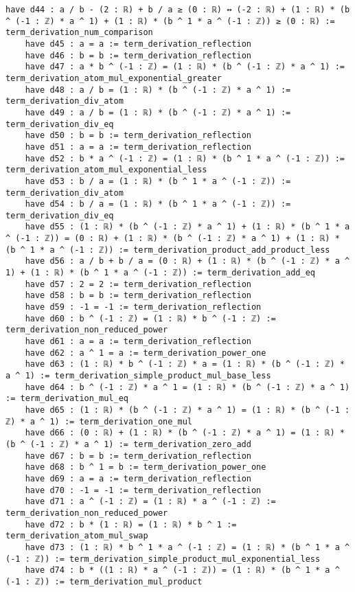 \documentclass{article}
\begin{document}
\begin{tcolorbox}[colback=white!10, width=\linewidth]
\begin{lstlisting}[language=Lean4]
    have d44 : a / b - (2 : ℝ) + b / a ≥ (0 : ℝ) ↔ (-2 : ℝ) + (1 : ℝ) * (b ^ (-1 : ℤ) * a ^ 1) + (1 : ℝ) * (b ^ 1 * a ^ (-1 : ℤ)) ≥ (0 : ℝ) := term_derivation_num_comparison
    have d45 : a = a := term_derivation_reflection
    have d46 : b = b := term_derivation_reflection
    have d47 : a * b ^ (-1 : ℤ) = (1 : ℝ) * (b ^ (-1 : ℤ) * a ^ 1) := term_derivation_atom_mul_exponential_greater
    have d48 : a / b = (1 : ℝ) * (b ^ (-1 : ℤ) * a ^ 1) := term_derivation_div_atom
    have d49 : a / b = (1 : ℝ) * (b ^ (-1 : ℤ) * a ^ 1) := term_derivation_div_eq
    have d50 : b = b := term_derivation_reflection
    have d51 : a = a := term_derivation_reflection
    have d52 : b * a ^ (-1 : ℤ) = (1 : ℝ) * (b ^ 1 * a ^ (-1 : ℤ)) := term_derivation_atom_mul_exponential_less
    have d53 : b / a = (1 : ℝ) * (b ^ 1 * a ^ (-1 : ℤ)) := term_derivation_div_atom
    have d54 : b / a = (1 : ℝ) * (b ^ 1 * a ^ (-1 : ℤ)) := term_derivation_div_eq
    have d55 : (1 : ℝ) * (b ^ (-1 : ℤ) * a ^ 1) + (1 : ℝ) * (b ^ 1 * a ^ (-1 : ℤ)) = (0 : ℝ) + (1 : ℝ) * (b ^ (-1 : ℤ) * a ^ 1) + (1 : ℝ) * (b ^ 1 * a ^ (-1 : ℤ)) := term_derivation_product_add_product_less
    have d56 : a / b + b / a = (0 : ℝ) + (1 : ℝ) * (b ^ (-1 : ℤ) * a ^ 1) + (1 : ℝ) * (b ^ 1 * a ^ (-1 : ℤ)) := term_derivation_add_eq
    have d57 : 2 = 2 := term_derivation_reflection
    have d58 : b = b := term_derivation_reflection
    have d59 : -1 = -1 := term_derivation_reflection
    have d60 : b ^ (-1 : ℤ) = (1 : ℝ) * b ^ (-1 : ℤ) := term_derivation_non_reduced_power
    have d61 : a = a := term_derivation_reflection
    have d62 : a ^ 1 = a := term_derivation_power_one
    have d63 : (1 : ℝ) * b ^ (-1 : ℤ) * a = (1 : ℝ) * (b ^ (-1 : ℤ) * a ^ 1) := term_derivation_simple_product_mul_base_less
    have d64 : b ^ (-1 : ℤ) * a ^ 1 = (1 : ℝ) * (b ^ (-1 : ℤ) * a ^ 1) := term_derivation_mul_eq
    have d65 : (1 : ℝ) * (b ^ (-1 : ℤ) * a ^ 1) = (1 : ℝ) * (b ^ (-1 : ℤ) * a ^ 1) := term_derivation_one_mul
    have d66 : (0 : ℝ) + (1 : ℝ) * (b ^ (-1 : ℤ) * a ^ 1) = (1 : ℝ) * (b ^ (-1 : ℤ) * a ^ 1) := term_derivation_zero_add
    have d67 : b = b := term_derivation_reflection
    have d68 : b ^ 1 = b := term_derivation_power_one
    have d69 : a = a := term_derivation_reflection
    have d70 : -1 = -1 := term_derivation_reflection
    have d71 : a ^ (-1 : ℤ) = (1 : ℝ) * a ^ (-1 : ℤ) := term_derivation_non_reduced_power
    have d72 : b * (1 : ℝ) = (1 : ℝ) * b ^ 1 := term_derivation_atom_mul_swap
    have d73 : (1 : ℝ) * b ^ 1 * a ^ (-1 : ℤ) = (1 : ℝ) * (b ^ 1 * a ^ (-1 : ℤ)) := term_derivation_simple_product_mul_exponential_less
    have d74 : b * ((1 : ℝ) * a ^ (-1 : ℤ)) = (1 : ℝ) * (b ^ 1 * a ^ (-1 : ℤ)) := term_derivation_mul_product

\end{lstlisting}
\end{tcolorbox}
\end{document}
